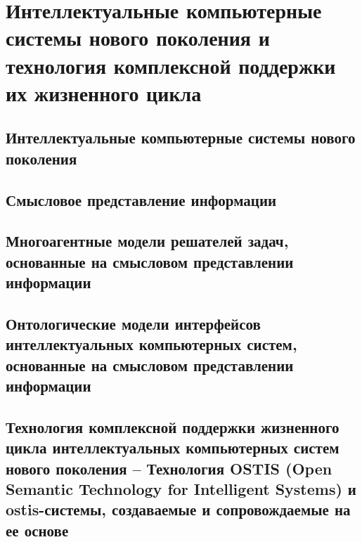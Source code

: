 \chapter{Интеллектуальные компьютерные системы нового поколения и технология комплексной поддержки их жизненного цикла}
\label{chapter_new_generation_systems} 


\section{Интеллектуальные компьютерные системы нового поколения}
\section{Смысловое представление информации}
\section{Многоагентные модели решателей задач, основанные на смысловом представлении информации}
\section{Онтологические модели интерфейсов интеллектуальных компьютерных систем, основанные на смысловом представлении информации}
\section{Технология комплексной поддержки жизненного цикла интеллектуальных компьютерных систем нового поколения -- Технология OSTIS (Open Semantic Technology for Intelligent Systems) и ostis-системы, создаваемые и сопровождаемые на ее основе}

%
